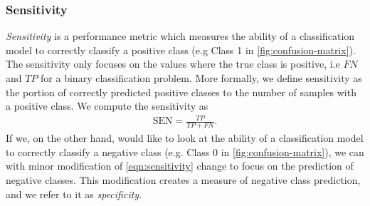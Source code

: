 \subsubsection{Sensitivity}
\label{sec:sensitivity}
\textit{Sensitivity} is a performance metric which measures the ability of a classification model to correctly classify a positive class (e.g Class 1 in \cref{fig:confusion-matrix}). The sensitivity only focuses on the values where the true class is positive, i.e $FN$ and $TP$ for a binary classification problem. More formally, we define sensitivity as the portion of correctly predicted positive classes to the number of samples with a positive class. We compute the sensitivity as
\begin{align}
    \text{SEN} = \frac{TP}{TP + FN}.
    \label{eqn:sensitivity}
\end{align}
If we, on the other hand, would like to look at the ability of a classification model to correctly classify a negative class (e.g. Class 0 in \cref{fig:confusion-matrix}), we can with minor modification of \cref{eqn:sensitivity} change to focus on the prediction of negative classes. This modification creates a measure of negative class prediction, and we refer to it as \textit{specificity}.